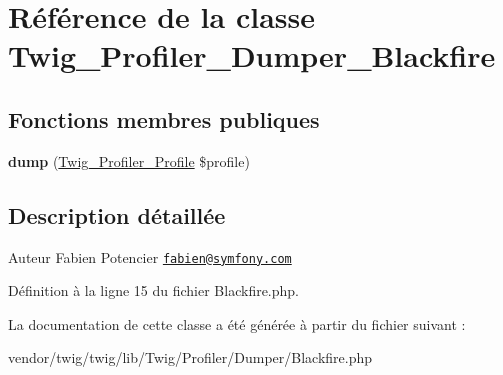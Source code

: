 \hypertarget{class_twig___profiler___dumper___blackfire}{}\section{Référence de la classe Twig\+\_\+\+Profiler\+\_\+\+Dumper\+\_\+\+Blackfire}
\label{class_twig___profiler___dumper___blackfire}
\subsection*{Fonctions membres publiques}
\begin{DoxyCompactItemize}
\item 
{\bfseries dump} (\hyperlink{class_twig___profiler___profile}{Twig\+\_\+\+Profiler\+\_\+\+Profile} \$profile)\hypertarget{class_twig___profiler___dumper___blackfire_a6c5847be5fe44203b20ccca8ce59c05b}{}\label{class_twig___profiler___dumper___blackfire_a6c5847be5fe44203b20ccca8ce59c05b}

\end{DoxyCompactItemize}


\subsection{Description détaillée}
\begin{DoxyAuthor}{Auteur}
Fabien Potencier \href{mailto:fabien@symfony.com}{\tt fabien@symfony.\+com} 
\end{DoxyAuthor}


Définition à la ligne 15 du fichier Blackfire.\+php.



La documentation de cette classe a été générée à partir du fichier suivant \+:\begin{DoxyCompactItemize}
\item 
vendor/twig/twig/lib/\+Twig/\+Profiler/\+Dumper/Blackfire.\+php\end{DoxyCompactItemize}
